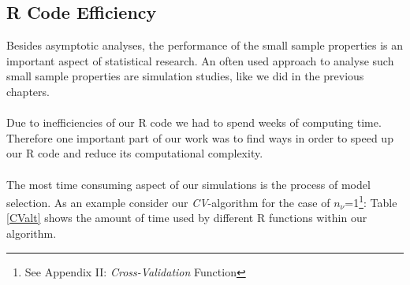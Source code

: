 \documentclass[Research_Module_ES.tex]{subfiles}
\begin{document}
\subsection{R Code Efficiency}
Besides asymptotic analyses, the performance of the small sample properties is an important aspect of statistical research. An often used approach to analyse such small sample properties are simulation studies, like we did in the previous chapters.\\
\\
Due to inefficiencies of our R code we had to spend weeks of computing time. Therefore one important part of our work was to find ways in order to speed up our R code and reduce its computational complexity.\\
\\
The most time consuming aspect of our simulations is the process of model selection. As an example consider our \textit{CV}-algorithm for the case of $n_\nu$=1\footnote{See Appendix II: \textit{Cross-Validation} Function}: Table \ref{CValt} shows the amount of time used by different R functions within our algorithm.
\end{document}
